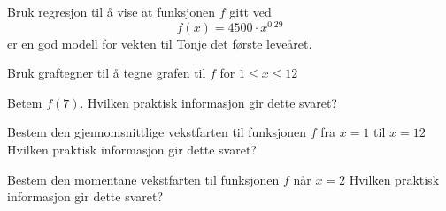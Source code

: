 \begin{oppgaver}
     Bruk regresjon til å vise at funksjonen $f$ gitt ved
    \begin{equation*}
        f(x) = 4500 \cdot x^{0.29}
    \end{equation*}
    er en god modell for vekten til Tonje det første leveåret.
\end{oppgaver}

\begin{oppgaver}
     Bruk graftegner til å tegne grafen til $f$ for $1 \leq x \leq 12$
\end{oppgaver}

\begin{oppgaver}
     Betem $f(7)$. Hvilken praktisk informasjon gir dette svaret?
\end{oppgaver}

\begin{oppgaver}
     Bestem den gjennomsnittlige vekstfarten til funksjonen $f$ fra $x = 1$ til $x = 12$ Hvilken praktisk informasjon gir dette svaret?
\end{oppgaver}

\begin{oppgaver}
     Bestem den momentane vekstfarten til funksjonen $f$ når $x=2$
    Hvilken praktisk informasjon gir dette svaret?
\end{oppgaver}


\Oppgave[5] %

\begin{figure}[H]
    \centering
    \begin{subfigure}[b]{0.06\textwidth}
        \centering
        \caption{}
    \end{subfigure}%
    ~
    \begin{subfigure}[b]{0.18\textwidth}
        \centering
        \caption{}
    \end{subfigure}%
    ~
    \begin{subfigure}[b]{0.3\textwidth}
        \centering
        \caption{}
    \end{subfigure}%
    ~
    \begin{subfigure}[b]{0.42\textwidth}
        \centering
        \caption{}
    \end{subfigure}%
    \caption{}
    \label{fig:del-2-oppgave-2.8}
\end{figure}

